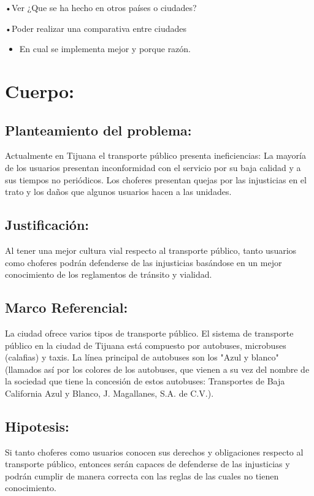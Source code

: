 \documentclass{bmcart}
\begin{document}
•Ver ¿Que se ha hecho en otros países o ciudades?

•Poder realizar una comparativa entre ciudades
\begin{itemize}
	\item En cual se implementa mejor y porque razón.
\end{itemize}

\section*{Cuerpo:}

\subsection{Planteamiento del problema:}

Actualmente en Tijuana el transporte público presenta ineficiencias: 
La mayoría de los usuarios presentan inconformidad con el servicio por su baja calidad y a sus tiempos no periódicos.
Los choferes presentan quejas por las injusticias en el trato  y los daños que algunos usuarios hacen a las unidades. 

\subsection{Justificación:}

Al tener una mejor cultura vial respecto al transporte público, tanto usuarios como choferes podrán defenderse de las injusticias basándose en un mejor conocimiento de los reglamentos de tránsito y vialidad.


\subsection{Marco Referencial:}

La ciudad ofrece varios tipos de transporte público. El sistema de transporte público en la ciudad de Tijuana está compuesto por autobuses, microbuses (calafias) y taxis.
La línea principal de autobuses son los "Azul y blanco" (llamados así por los colores de los autobuses, que vienen a su vez del nombre de la sociedad que tiene la concesión de estos autobuses: Transportes de Baja California Azul y Blanco, J. Magallanes, S.A. de C.V.). 

\subsection{Hipotesis:}
Si tanto choferes como usuarios conocen sus derechos y obligaciones respecto al transporte público, entonces serán capaces de defenderse de las injusticias y podrán cumplir de manera correcta con las reglas de las cuales no tienen conocimiento.
\end{document}

